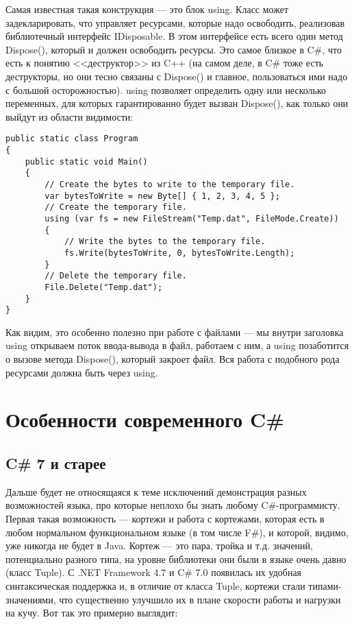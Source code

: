 \documentclass{../../text-style}
\begin{document}
Самая известная такая конструкция --- это блок using. Класс может задекларировать, что управляет ресурсами, которые надо освободить, реализовав библиотечный интерфейс IDisposable. В этом интерфейсе есть всего один метод Dispose(), который и должен освободить ресурсы. Это самое близкое в C\#, что есть к понятию <<деструктор>> из C++ (на самом деле, в C\# тоже есть деструкторы, но они тесно связаны с Dispose() и главное, пользоваться ими надо с большой осторожностью). using позволяет определить одну или несколько переменных, для которых гарантированно будет вызван Dispose(), как только они выйдут из области видимости:

\begin{verbatim}
public static class Program 
{
    public static void Main() 
    {
        // Create the bytes to write to the temporary file.
        var bytesToWrite = new Byte[] { 1, 2, 3, 4, 5 };
        // Create the temporary file.
        using (var fs = new FileStream("Temp.dat", FileMode.Create)) 
        {
            // Write the bytes to the temporary file.
            fs.Write(bytesToWrite, 0, bytesToWrite.Length);
        }
        // Delete the temporary file.
        File.Delete("Temp.dat");
    }
}
\end{verbatim}

Как видим, это особенно полезно при работе с файлами --- мы внутри заголовка using открываем поток ввода-вывода в файл, работаем с ним, а using позаботится о вызове метода Dispose(), который закроет файл. Вся работа с подобного рода ресурсами должна быть через using.

\section{Особенности современного C\#}

\subsection{C\# 7 и старее}

Дальше будет не относящаяся к теме исключений демонстрация разных возможностей языка, про которые неплохо бы знать любому C\#-программисту. Первая такая возможность --- кортежи и работа с кортежами, которая есть в любом нормальном функциональном языке (в том числе F\#), и которой, видимо, уже никогда не будет в Java. Кортеж --- это пара, тройка и т.д. значений, потенциально разного типа, на уровне библиотеки они были в языке очень давно (класс Tuple). С .NET Framework 4.7 и C\# 7.0 появилась их удобная синтаксическая поддержка и, в отличие от класса Tuple, кортежи стали типами-значениями, что существенно улучшило их в плане скорости работы и нагрузки на кучу. Вот так это примерно выглядит:
\end{document}
